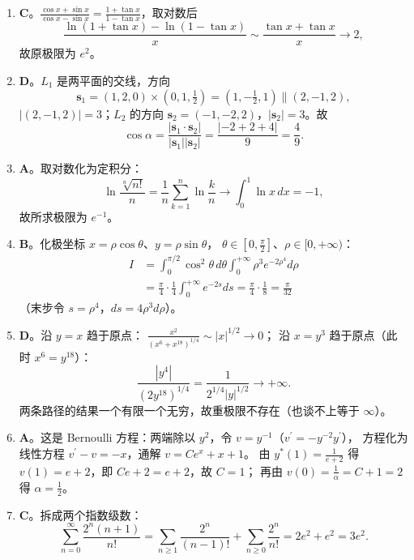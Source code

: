 \begin{enumerate}
{\begin{enumerate}
	\item
	\textbf{C}。$\frac{\cos x+\sin x}{\cos x-\sin x}=\frac{1+\tan x}{1-\tan x}$，取对数后
	\[
	\frac{\ln(1+\tan x)-\ln(1-\tan x)}{x}\sim\frac{\tan x+\tan x}{x}\longrightarrow2 ,
	\]
	故原极限为 $e^{2}$。

	\item
	\textbf{D}。$L_1$ 是两平面的交线，方向
	\[
	\bm{s}_1=(1,2,0)\times\left(0,1,\tfrac12\right)=\left(1,-\tfrac12,1\right)\parallel(2,-1,2),
	\]
	$\left|(2,-1,2)\right|=3$；$L_2$ 的方向 $\bm{s}_2=(-1,-2,2)$，$\left|\bm{s}_2\right|=3$。故
	\[
	\cos\alpha=\frac{\left|\bm{s}_1\cdot\bm{s}_2\right|}{\left|\bm{s}_1\right|\left|\bm{s}_2\right|}
	=\frac{|-2+2+4|}{9}=\frac{4}{9} .
	\]

	\item
	\textbf{A}。取对数化为定积分：
	\[
	\ln\frac{\sqrt[n]{n!}}{n}=\frac{1}{n}\sum_{k=1}^{n}\ln\frac{k}{n}
	\longrightarrow\int_0^1\ln x\,dx=-1 ,
	\]
	故所求极限为 $e^{-1}$。

	\item
	\textbf{B}。化极坐标 $x=\rho\cos\theta$、$y=\rho\sin\theta$，
	$\theta\in\left[0,\frac{\pi}{2}\right]$、$\rho\in[0,+\infty)$：
	\begin{align*}
	I&=\int_0^{\pi/2}\!\cos^{2}\theta\,d\theta\int_0^{+\infty}\!\rho^{3}e^{-2\rho^{4}}d\rho\\
	&=\frac{\pi}{4}\cdot\frac{1}{4}\int_0^{+\infty}\!e^{-2s}ds
	=\frac{\pi}{4}\cdot\frac{1}{8}=\frac{\pi}{32}
	\end{align*}
	（末步令 $s=\rho^{4}$，$ds=4\rho^{3}d\rho$）。

	\item
	\textbf{D}。沿 $y=x$ 趋于原点：
	$\frac{x^{2}}{\left(x^{6}+x^{18}\right)^{1/4}}\sim|x|^{1/2}\to0$；
	沿 $x=y^{3}$ 趋于原点（此时 $x^{6}=y^{18}$）：
	\[
	\frac{\left|y^{4}\right|}{\left(2y^{18}\right)^{1/4}}
	=\frac{1}{2^{1/4}|y|^{1/2}}\longrightarrow+\infty .
	\]
	两条路径的结果一个有限一个无穷，故重极限不存在（也谈不上等于 $\infty$）。

	\item
	\textbf{A}。这是 Bernoulli 方程：两端除以 $y^{2}$，令 $v=y^{-1}$（$v^{\prime}=-y^{-2}y^{\prime}$），
	方程化为线性方程 $v^{\prime}-v=-x$，通解 $v=Ce^{x}+x+1$。
	由 $y^{*}(1)=\frac{1}{e+2}$ 得 $v(1)=e+2$，即 $Ce+2=e+2$，故 $C=1$；
	再由 $v(0)=\frac{1}{\alpha}=C+1=2$ 得 $\alpha=\frac{1}{2}$。

	\item
	\textbf{C}。拆成两个指数级数：
	\[
	\sum_{n=0}^{\infty}\frac{2^{n}(n+1)}{n!}
	=\sum_{n\geqslant1}\frac{2^{n}}{(n-1)!}+\sum_{n\geqslant0}\frac{2^{n}}{n!}
	=2e^{2}+e^{2}=3e^{2} .
	\]


\end{enumerate}}
\end{enumerate}
